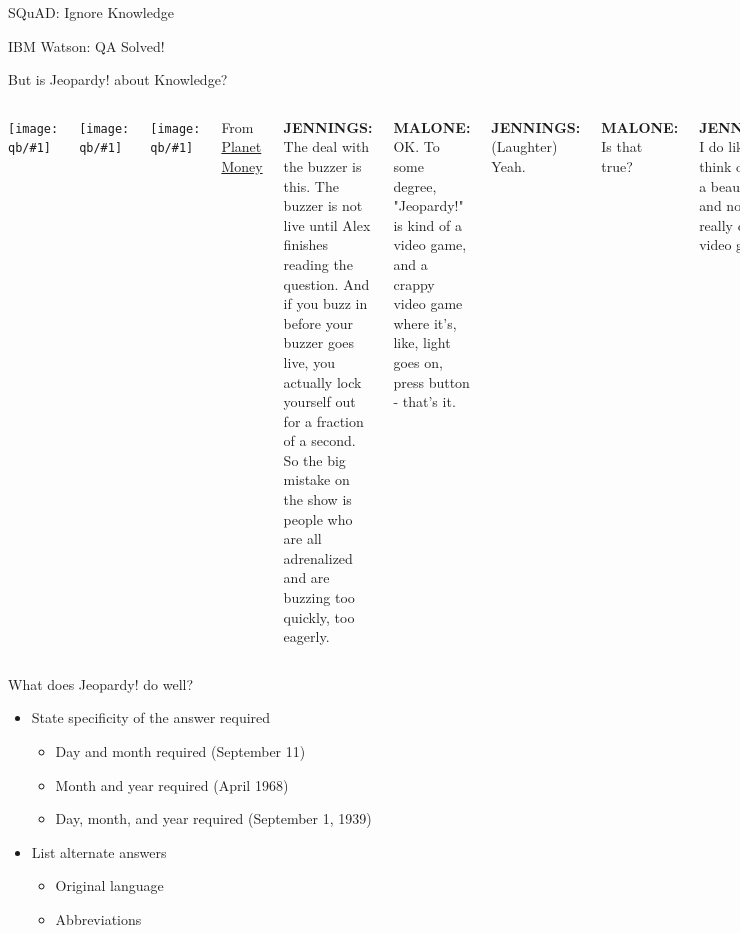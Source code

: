 \documentclass[xcolor=dvipsnames,xcolor=table]{beamer}
\newcommand{\fsi}[2]{
\begin{frame}[plain]
\vspace*{-1pt}
\makebox[\linewidth]{\texttt{[image: \#1]}}
\begin{center}
#2
\end{center}
\end{frame}
}
\newcommand{\gfxq}[2]{
\begin{center}
	\texttt{[image: qb/\#1]}
\end{center}
}
\begin{document}
\fsi{qb/human_reading}{SQuAD: Ignore Knowledge}

\fsi{qb/jeopardy}{IBM Watson: QA Solved!}

\begin{frame}{But is Jeopardy! about Knowledge?}

  \begin{columns}
    \gfxq{planet_money}{.75}
    \gfxq{jennings}{.7}  
    \gfxq{kenny_malone}{.7}

    From \href{file:///Users/jbg/repositories/jbg-talks/qb/jennings-buzzer.mp3}{Planet Money} \\
    
    \small

    {\bf JENNINGS:} The deal with the buzzer is this. The buzzer is
    not live until Alex finishes reading the question. And if you buzz
    in before your buzzer goes live, \alert<1>{you actually lock yourself out
    for a fraction of a second}. So the big mistake on the show is
    people who are all adrenalized and are buzzing too quickly, too
    eagerly.

    \pause

    {\bf MALONE:} OK. To some degree, "Jeopardy!" is kind of a video game, and a \alert<2>{crappy video game where it's, like, light goes on, press button} - that's it.

    \pause
    
    {\bf JENNINGS:} (Laughter) Yeah.

    {\bf MALONE:} Is that true?

    {\bf JENNINGS:} I do like to think of it as a \alert<3>{beautiful art} and not a really crappy video game.
    
  \end{columns}
  
\end{frame}

\begin{frame}{What does Jeopardy! do well?}
  \begin{itemize}
    \item State specificity of the answer required
    \begin{itemize}
      \item Day and month required (September 11)
      \item Month and year required (April 1968)
      \item Day, month, and year required (September 1, 1939)
    \end{itemize}
    \item List alternate answers
    \begin{itemize}
      \item Original language
      \item Abbreviations
    \end{itemize}
  \end{itemize}
\end{frame}
\end{document}
